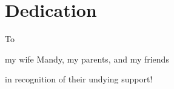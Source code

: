 \chapter*{Dedication}
To

my wife Mandy,
my parents,
and my friends

in recognition of their undying support!
